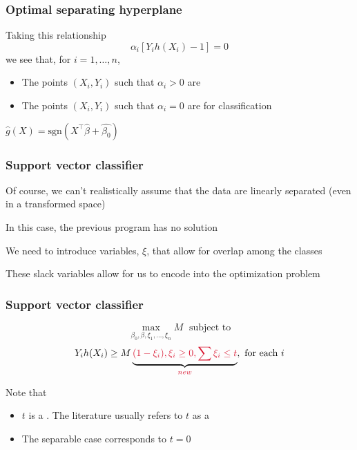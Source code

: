 \documentclass[12pt]{beamer}
\begin{document}
\begin{frame}
\frametitle{Optimal separating hyperplane}
Taking this relationship
\[
\alpha_i [Y_ih(X_i) - 1] = 0
\]
we see that, for $i = 1,\ldots,n$,

\begin{itemize}
\item The points $(X_i,Y_i)$ such that $\alpha_i > 0$ are 
\item The points $(X_i,Y_i)$ such that $\alpha_i =0$ are  for classification
\end{itemize}


\vvvsp

\vvsp
{}  $\hat{g}(X) = \textrm{sgn}(X^{\top}\hat{\beta} + \hat{\beta_0})$


\end{frame}


\begin{frame}
\frametitle{Support vector classifier}
Of course, we can't realistically assume that the data are linearly separated (even in a transformed space)

\vsp
In this case, the previous program has no  solution

\vsp
We need to introduce  variables, $\xi$, that allow for overlap among the classes

\vsp
These slack variables allow for us to encode  into the optimization problem
\end{frame}


\begin{frame}
\frametitle{Support vector classifier}
\[
\max_{\beta_0,\beta,\xi_1,\ldots,\xi_n} M \; \textrm{ subject to}
\]
\[
Y_ih(X_i) \geq M  \underbrace{\alr{(1- \xi_i), \xi_i \geq 0, \sum \xi_i \leq t}}_{\alr{new}}, \textrm{ for each } i
\]
\vsp

Note that
\begin{itemize}
\item  $t$ is a  .  The literature usually refers to $t$ as a 


\item The separable case corresponds to  $t = 0$
\end{itemize}
\end{frame}
\end{document}

